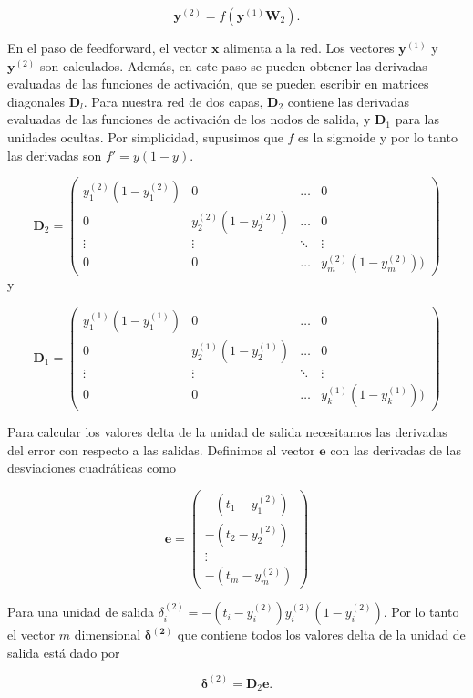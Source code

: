 \[
\mathbf{y}^{(2)} = f(\mathbf{y}^{(1)}\mathbf{W}_2).
\]

En el paso de feedforward, el vector $\mathbf{x}$ alimenta a la red.
Los vectores $\mathbf{y}^{(1)}$ y $\mathbf{y}^{(2)}$ son calculados.
Además, en este paso se pueden obtener las derivadas evaluadas 
de las funciones de activación, que se pueden escribir en matrices diagonales $\mathbf{D}_l$. Para nuestra red de dos capas,
$\mathbf{D}_2$ contiene las derivadas evaluadas de las funciones
de activación de los nodos de salida, y $\mathbf{D}_1$ para
las unidades ocultas. Por simplicidad, supusimos que $f$ es la sigmoide
y por lo tanto las derivadas son $f' = y(1-y)$.

\[
\mathbf{D}_2 = 
\begin{pmatrix}
    y_1^{(2)}(1-y_1^{(2)}) & 0 & \dots & 0 \\
    0 & y_2^{(2)}(1- y_2^{(2)}) & \dots & 0 \\
    \vdots & \vdots & \ddots & \vdots\\
    0 & 0 & \dots & y_m^{(2)}(1-y_m^{(2)}))
\end{pmatrix}
\]   
y


\[
\mathbf{D}_1 = 
\begin{pmatrix}
    y_1^{(1)}(1 - y_1^{(1)}) & 0 & \dots & 0 \\
    0 & y_2^{(1)}(1 - y_2^{(1)}) & \dots & 0 \\
    \vdots & \vdots & \ddots & \vdots\\
    0 & 0 & \dots & y_k^{(1)}(1 - y_k^{(1)}))
\end{pmatrix}
\]

Para calcular los valores delta de la unidad de salida
necesitamos las derivadas del error con respecto a las salidas. 
Definimos al vector $\mathbf{e}$ con las derivadas de las desviaciones cuadráticas como

\[
\mathbf{e} = 
\begin{pmatrix}
    - (t_1 - y_1^{(2)}) \\
    - (t_2 - y_2^{(2)}) \\
    \vdots \\
    - (t_m - y_m^{(2)})
\end{pmatrix}
\]

Para una unidad de salida  $\delta_i^{(2)} = - (t_i - y_i^{(2)})y_i^{(2)}(1- y_i^{(2)})$. Por lo tanto
el vector $m$ dimensional $\boldsymbol{\delta^{(2)}}$ que contiene todos los
valores delta de la unidad de salida está dado por

\[
\boldsymbol{\delta}^{(2)} = \mathbf{D}_2\mathbf{e}.
\]



